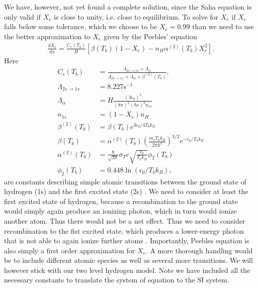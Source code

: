 \documentclass[twocolumn]{aastex62}
\begin{document}
We have, however, not yet found a complete solution, since the Saha equation is only valid if $X_e$ is close to unity, i.e. close to equilibrium. To solve for $X_e$ if $X_e$ falls below some tolerance, which we choose to be $X_e = 0.99$ than we need to use the better approximation to $X_e$ given by the Peebles' equation
\begin{align}
    \frac{dX_e}{dx} = \frac{C_r(T_b)}{H} \left[\beta(T_b)(1-X_e) - n_H
              \alpha^{(2)}(T_b)X_e^2\right].
    \label{eq:peebles}
\end{align}
Here 
\begin{align}
    C_r(T_b) &= \frac{\Lambda_{2s\rightarrow1s} +
              \Lambda_{\alpha}}{\Lambda_{2s\rightarrow1s} + \Lambda_{\alpha} +
              \beta^{(2)}(T_b)}, \\
    \Lambda_{2s\rightarrow1s} &= 8.227 \textrm{s}^{-1}\\
    \Lambda_{\alpha} &= H\frac{(3\epsilon_0)^3}{(8\pi)^2 (\hbar c)^3 n_{1s}}\\
    n_{1s} &= (1-X_e)n_H \\
    \beta^{(2)}(T_b) &= \beta(T_b) e^{3\epsilon_0/4T_bk_B} \\
    \beta(T_b) &= \alpha^{(2)}(T_b) \left(\frac{m_e
              T_bk_B}{2\pi \hbar^2}\right)^{3/2} e^{-\epsilon_0/T_bk_B} \\
    \alpha^{(2)}(T_b) &= \frac{8}{\sqrt{3\pi}}
              \sigma_T c\sqrt{\frac{\epsilon_0}{T_bk_B}}\phi_2(T_b) \\
    \phi_2(T_b) &= 0.448\ln(\epsilon_0/T_bk_B),
\end{align}
are constants describing simple atomic transitions between the ground state of hydrogen (1s) and the first excited state (2s) \citep[]{winther:2020}. We need to consider at least the first excited state of hydrogen, because a recombination to the ground state would simply again produce an ionizing photon, which in turn would ionize another atom. Thus there would not be a net effect. Thus we need to consider recombination to the fist excited state, which produces a lower-energy photon that is not able to again ionize further atoms \citep[p. 71]{dodelson:2003}. Importantly, Peebles equation is also simply a first order approximation for $X_e$. A more thorough handling would be to include different atomic species as well as several more transitions. We will however stick with our two level hydrogen model. Note we have included all the necessary constants to translate the system of equation to the SI system. 
\end{document}
